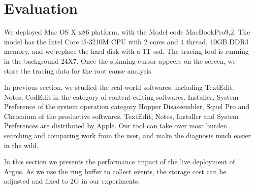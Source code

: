 \section{Evaluation}
We deployed \xxx Mac OS X x86 platform, with the Model code MacBookPro9,2.  The
model has the Intel Core i5-3210M CPU with 2 cores and 4 thread, 10GB DDR3
memory, and we replace the hard disk with a 1T ssd.  The tracing tool is
running in the background 24X7.  Once the spinning cursor appeers on the
screen, we store the tracing data for the root cause analysis.

In previous section, we studied the real-world softwares, including TextEdit,
Notes, CodEdit in the category of content editing softwares, Installer, System
Preference of the system operation category Hopper Disassembler, Squel Pro and
Chromium of the productive softwares, TextEdit, Notes, Installer and System
Preferences are distributed by Apple.  
Our tool can take over most burden searching and comparing work from the user,
and make the diagnosis much easier in the wild.

In this section we presents the performance impact of the live deployment of Argus.
As we use the ring buffer to collect events, the storage cost can be adjusted
and fixed to 2G in our experiments.
